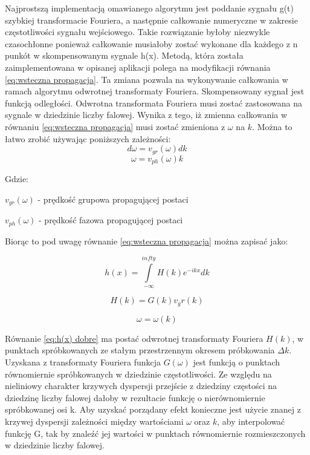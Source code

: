 Najprostszą implementacją omawianego algorytmu jest poddanie sygnału g(t) szybkiej transformacie Fouriera, a następnie całkowanie numeryczne w zakresie częstotliwości sygnału wejściowego. Takie rozwiązanie byłoby niezwykle czasochłonne ponieważ całkowanie musiałoby zostać wykonane dla każdego z n punkót w skompensowanym sygnale h(x). Metodą, która została zaimplementowana w opisanej aplikacji polega na modyfikacji równania \ref{eq:wsteczna propagacja}. Ta zmiana pozwala na wykonywanie całkowania w ramach algorytmu odwrotnej transformaty Fouriera. Skompensowany sygnał jest funkcją odległości. Odwrotna transformata Fouriera musi zostać zastosowana na sygnale w dziedzinie liczby falowej. Wynika z tego, iż zmienna całkowania w równaniu \ref{eq:wsteczna propagacja} musi zostać zmieniona z $\omega$ na $k$. Można to łatwo zrobić używając poniższych zależności:
\begin{equation}
d\omega = v_{gr}(\omega)dk
\end{equation}
\begin{equation}
\omega = v_{ph}(\omega)k
\end{equation}

Gdzie:

$v_{gr}(\omega)$ - prędkość grupowa propagującej postaci

$v_{ph}(\omega)$ - prędkość fazowa propagującej postaci

Biorąc to pod uwagę równanie \ref{eq:wsteczna propagacja} można zapisać jako:


\begin{equation}
h(x) = \int\limits_{-\infty}^{infty}H(k)e^{-ikx}dk \label{eq:h(x) dobre}
\end{equation}

\begin{equation}
H(k) = G(k)v_gr(k)
\end{equation}

$$
\omega = \omega(k)
$$

Równanie \ref{eq:h(x) dobre} ma postać odwrotnej transformaty Fouriera $H(k)$, w punktach spróbkowanych ze stałym przestrzennym okresem próbkowania $\Delta k$. Uzyskana z transformaty Fouriera funkcja $G(\omega)$ jest funkcją o punktach równomiernie spróbkowanych w dziedzinie częstotliwości. Ze względu na nieliniowy charakter krzywych dyspersji przejście z dziedziny częstości na dziedzinę liczby falowej dałoby w rezultacie funkcję o nierównomiernie spróbkowanej osi k. Aby uzyskać porządany efekt konieczne jest użycie znanej z krzywej dyspersji zależności między wartościami $\omega$ oraz $k$, aby interpolować funkcję G, tak by znaleźć jej wartości w punktach równomiernie rozmieszczonych w dziedzinie liczby falowej.

